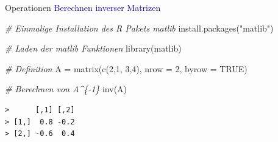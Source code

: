 \documentclass[
  8pt,
  ignorenonframetext,
]{beamer}
\newenvironment{Shaded}{\begin{snugshade}}{\end{snugshade}}
\newcommand{\AttributeTok}[1]{\textcolor[rgb]{0.77,0.63,0.00}{#1}}
\newcommand{\CommentTok}[1]{\textcolor[rgb]{0.56,0.35,0.01}{\textit{#1}}}
\newcommand{\ConstantTok}[1]{\textcolor[rgb]{0.00,0.00,0.00}{#1}}
\newcommand{\DecValTok}[1]{\textcolor[rgb]{0.00,0.00,0.81}{#1}}
\newcommand{\FunctionTok}[1]{\textcolor[rgb]{0.00,0.00,0.00}{#1}}
\newcommand{\NormalTok}[1]{#1}
\newcommand{\OtherTok}[1]{\textcolor[rgb]{0.56,0.35,0.01}{#1}}
\newcommand{\StringTok}[1]{\textcolor[rgb]{0.31,0.60,0.02}{#1}}
\begin{document}
\begin{frame}[fragile]{Operationen}
\protect\hypertarget{operationen-26}{}
\textcolor{darkblue}{Berechnen inverser Matrizen} \footnotesize
\vspace{2mm} 

\begin{Shaded}
\begin{Highlighting}[]
\CommentTok{\# Einmalige Installation des R Pakets matlib}
\FunctionTok{install.packages}\NormalTok{(}\StringTok{"matlib"}\NormalTok{)}
\end{Highlighting}
\end{Shaded}

\vspace{2mm}

\begin{Shaded}
\begin{Highlighting}[]
\CommentTok{\# Laden der matlib Funktionen}
\FunctionTok{library}\NormalTok{(matlib)}

\CommentTok{\# Definition}
\NormalTok{A }\OtherTok{=} \FunctionTok{matrix}\NormalTok{(}\FunctionTok{c}\NormalTok{(}\DecValTok{2}\NormalTok{,}\DecValTok{1}\NormalTok{,}
             \DecValTok{3}\NormalTok{,}\DecValTok{4}\NormalTok{),}
           \AttributeTok{nrow  =} \DecValTok{2}\NormalTok{,}
           \AttributeTok{byrow =} \ConstantTok{TRUE}\NormalTok{)}

\CommentTok{\# Berechnen von A\^{}\{{-}1\}}
\FunctionTok{inv}\NormalTok{(A)}
\end{Highlighting}
\end{Shaded}

\begin{verbatim}
>      [,1] [,2]
> [1,]  0.8 -0.2
> [2,] -0.6  0.4
\end{verbatim}
\end{frame}
\end{document}
